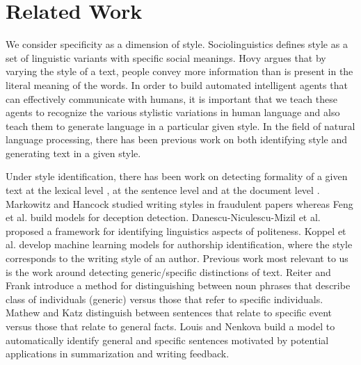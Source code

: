 \documentclass[11pt,a4paper]{article}
\begin{document}
\section{Related Work}

We consider specificity as a dimension of style. Sociolinguistics defines style as a set of linguistic variants with specific social meanings. 
Hovy \cite{hovy1987generating} argues that by varying the style of a text, people convey more information than is present in the literal meaning of the words.
In order to build automated intelligent agents that can effectively communicate with humans, it is important that we teach these agents to recognize the various stylistic variations in human language and also teach them to generate language in a particular given style. 
In the field of natural language processing, there has been previous work on both identifying style and generating text in a given style. 

Under style identification, there has been work on detecting formality of a given text at the lexical level \cite{brooke2010automatic,lahiri2011informality,brooke2014supervised,pavlick2015inducing}, at the sentence level \cite{pavlick2016empirical} and at the document level \cite{sheikha2010automatic,peterson2011email,mosquera2012smile}. 
Markowitz and Hancock \cite{markowitz2016linguistic} studied writing styles in fraudulent papers whereas Feng et al. \cite{feng2012syntactic} build models for deception detection. 
Danescu-Niculescu-Mizil et al. \cite{danescu2013computational} proposed a framework for identifying linguistics aspects of politeness. 
Koppel et al. \cite{koppel2002automatically,koppel2009computational,koppel2011authorship} develop machine learning models for authorship identification, where the style corresponds to the writing style of an author. 
Previous work most relevant to us is the work around detecting generic/specific distinctions of text. Reiter and Frank \cite{reiter2010identifying} introduce a method for distinguishing between noun phrases that describe class of individuals (generic) versus those that refer to specific individuals. 
Mathew and Katz \cite{mathew2009supervised} distinguish between sentences that relate to specific event versus those that relate to general facts. 
Louis and Nenkova \cite{louis2011automatic} build a model to automatically identify general and specific sentences motivated by potential applications
in summarization and writing feedback.
\end{document}
